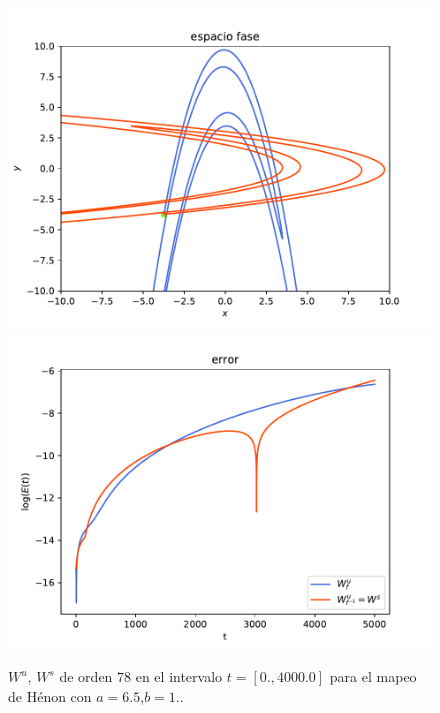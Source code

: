 \documentclass[11pt]{beamer}
\theoremstyle{definition}
\begin{document}
\begin{frame}
\begin{figure}
\centering
\includegraphics[scale=0.35]{h65}
\includegraphics[scale=0.35]{errorH65}
\caption{$W^{u}$, $W^{s}$ de orden $78$ en el intervalo $t=[0.,4000.0]$ para el mapeo de Hénon con $a=6.5$,$b=1.$.}
\label{Henon3}
\end{figure}

\end{frame}
\end{document}
